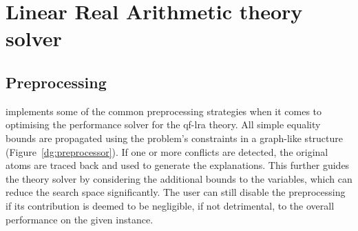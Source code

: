 \documentclass[runningheads]{llncs}
\begin{document}
\section{Linear Real Arithmetic theory solver}
\label{sec:lra-theory-solver}

\subsection*{Preprocessing}
\label{sec:preprocessing}

\dlinear implements some of the common preprocessing strategies when it comes to optimising the performance solver for the \gls{qf-lra} theory.
All simple equality bounds are propagated using the problem's constraints in a graph-like structure (Figure~\ref{dg:preprocessor}).
If one or more conflicts are detected, the original atoms are traced back and used to generate the explanations.
This further guides the theory solver by considering the additional bounds to the variables, which can reduce the search space significantly.
The user can still disable the preprocessing if its contribution is deemed to be negligible, if not detrimental, to the overall performance on the given instance.
\end{document}
